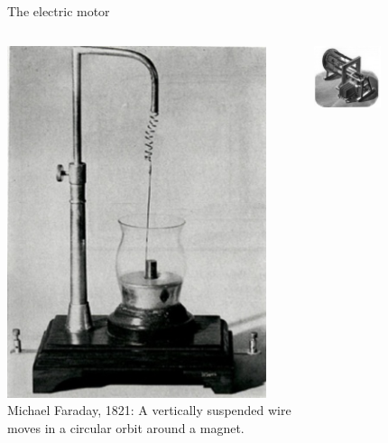 \begin{frame}{The electric motor}

\begin{columns}
  \begin{column}{0.40\textwidth}
   {\scriptsize
     \begin{center}
           \includegraphics[width=0.90\textwidth]{./images/photos/rotating_wire_faraday.jpg}\\
            Michael Faraday, 1821:
            A vertically suspended wire moves in a circular orbit around a magnet.
     \end{center}
   }
  \end{column}
  \begin{column}{0.60\textwidth}
     \begin{center}
   {\scriptsize
     \begin{center}
           \includegraphics[width=0.45\textwidth]{./images/photos/electric_motor_jacobi_1834.jpg}\\

\end{center}}
\end{center}
\end{column}
\end{columns}
\end{frame}
